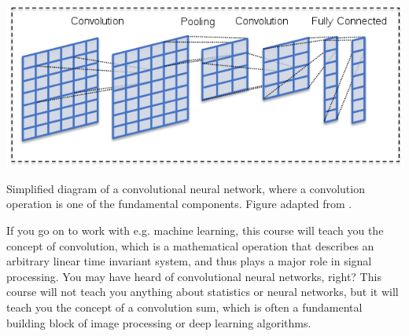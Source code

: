 \begin{marginfigure}[1cm]
\begin{center}
  \includegraphics[width=\textwidth]{ch01/figures/cnn.png}
\end{center}
\caption{Simplified diagram of a convolutional neural network, where a convolution operation is one of the fundamental components. Figure adapted from \citep{maier2019gentle}.}
\label{fig:cnn}
\end{marginfigure}

If you go on to work with e.g. machine learning, this course will
teach you the concept of convolution, which is a mathematical
operation that describes an arbitrary linear time invariant system,
and thus plays a major role in signal processing. You may have heard
of convolutional neural networks, right? This course will not teach
you anything about statistics or neural networks, but it will teach
you the concept of a convolution sum, which is often a fundamental
building block of image processing or deep learning
algorithms\cite{maier2019gentle}.
